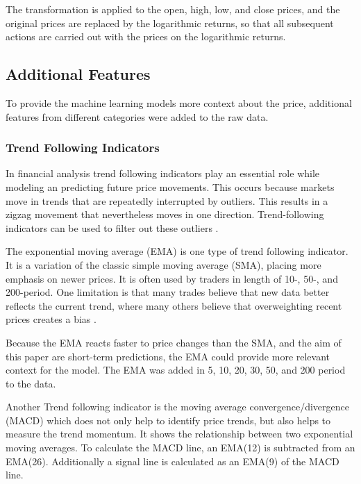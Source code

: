 The transformation is applied to the open, high, low, and close prices, and the original prices are replaced by the logarithmic returns, so that all subsequent actions are carried out with the prices on the logarithmic returns.

\subsection{Additional Features}
\label{chap:additional-features}

To provide the machine learning models more context about the price, additional features from different categories were added to the raw data.

\subsubsection{Trend Following Indicators}

In financial analysis trend following indicators play an essential role while modeling an predicting future price movements.
This occurs because markets move in trends that are repeatedly interrupted by outliers.
This results in a zigzag movement that nevertheless moves in one direction.
Trend-following indicators can be used to filter out these outliers \cite{investopia-trend-indicators}.

The exponential moving average (EMA) is one type of trend following indicator.
It is a variation of the classic simple moving average (SMA), placing more emphasis on newer prices.
It is often used by traders in length of 10-, 50-, and 200-period.
One limitation is that many trades believe that new data better reflects the current trend, where many others believe that overweighting recent prices creates a bias \cite{investopia-ema}.


Because the EMA reacts faster to price changes than the SMA, and the aim of this paper are short-term predictions, the EMA could provide more relevant context for the model.
The EMA was added in 5, 10, 20, 30, 50, and 200 period to the data.

Another Trend following indicator is the moving average convergence/divergence (MACD) which does not only help to identify price trends, but also helps to measure the trend momentum.
It shows the relationship between two exponential moving averages.
To calculate the MACD line, an EMA(12) is subtracted from an EMA(26).
Additionally a signal line is calculated as an EMA(9) of the MACD line.

